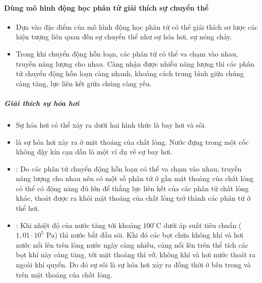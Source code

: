\paragraph{Dùng mô hình động học phân tử giải thích sự chuyển thể}
\begin{itemize}
    \item Dựa vào đặc điểm của mô hình động học phân tử có thể giải thích sơ lược các hiện tượng liên quan đến sự chuyển thể như sự hóa hơi, sự nóng chảy.
    \item Trong khi chuyển động hỗn loạn, các phân tử có thể va chạm vào nhau, truyền năng lượng cho nhau. Càng nhận được nhiều năng lượng thì các phân tử chuyển động hỗn loạn càng nhanh, khoảng cách trung bình giữa chúng càng tăng, lực liên kết giữa chúng càng yếu.
\end{itemize}

\subparagraph{Giải thích sự hóa hơi}
\begin{itemize}
    \item Sự hóa hơi có thể xảy ra dưới hai hình thức là bay hơi và sôi.
    \item {} là sự hóa hơi xảy ra ở mặt thoáng của chất lỏng. Nước đựng trong một cốc không đậy kín cạn dần là một ví dụ về sự bay hơi.
    \item {}: Do các phân tử chuyển động hỗn loạn có thể va chạm vào nhau, truyền năng lượng cho nhau nên có một số phân tử ở gần mặt thoáng của chất lỏng có thể có động năng đủ lớn để thắng lực liên kết của các phân tử chất lỏng khác, thoát được ra khỏi mặt thoáng của chất lỏng trở thành các phân tử ở thể hơi.
    \item {}: Khi nhiệt độ của nước tăng tới khoảng $100^\circ\text{C}$ dưới áp suất tiêu chuẩn ($1,01 \cdot 10^5\text{ Pa}$) thì nước bắt đầu sôi. Khi đó các bọt chứa không khí và hơi nước nổi lên trên lòng nước ngày càng nhiều, càng nổi lên trên thể tích các bọt khí này càng tăng, tới mặt thoáng thì vỡ, không khí và hơi nước thoát ra ngoài khí quyển. Do đó sự sôi là sự hóa hơi xảy ra đồng thời ở bên trong và trên mặt thoáng của chất lỏng.
\end{itemize}

